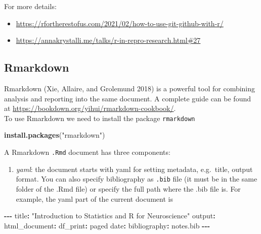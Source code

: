 \documentclass[
]{article}
\newenvironment{Shaded}{\begin{snugshade}}{\end{snugshade}}
\newcommand{\FunctionTok}[1]{\textcolor[rgb]{0.13,0.29,0.53}{\textbf{#1}}}
\newcommand{\NormalTok}[1]{#1}
\newcommand{\SpecialCharTok}[1]{\textcolor[rgb]{0.81,0.36,0.00}{\textbf{#1}}}
\newcommand{\StringTok}[1]{\textcolor[rgb]{0.31,0.60,0.02}{#1}}
\providecommand{\tightlist}{%
  \setlength{\itemsep}{0pt}\setlength{\parskip}{0pt}}
\begin{document}
For more details:

\begin{itemize}
\tightlist
\item
  \url{https://rfortherestofus.com/2021/02/how-to-use-git-github-with-r/}
\item
  \url{https://annakrystalli.me/talks/r-in-repro-research.html\#27}
\end{itemize}

\hypertarget{rmarkdown}{%
\subsection{Rmarkdown}\label{rmarkdown}}

Rmarkdown (Xie, Allaire, and Grolemund 2018) is a powerful tool for
combining analysis and reporting into the same document. A complete
guide can be found at
\url{https://bookdown.org/yihui/rmarkdown-cookbook/}.\\
To use Rmarkdown we need to install the package \texttt{rmarkdown}

\begin{Shaded}
\begin{Highlighting}[]
\FunctionTok{install.packages}\NormalTok{(}\StringTok{"rmarkdown"}\NormalTok{)}
\end{Highlighting}
\end{Shaded}

A Rmarkdown \texttt{.Rmd} document has three components:

\begin{enumerate}
\def\labelenumi{\arabic{enumi}.}
\tightlist
\item
  \emph{yaml}: the document starts with yaml for setting metadata,
  e.g.~title, output format. You can also specify bibliography as
  \texttt{.bib} file (it must be in the same folder of the .Rmd file) or
  specify the full path where the .bib file is. For example, the yaml
  part of the current document is
\end{enumerate}

\begin{Shaded}
\begin{Highlighting}[]
\SpecialCharTok{{-}{-}{-}}
\NormalTok{title}\SpecialCharTok{:} \StringTok{"Introduction to Statistics and R for Neuroscience"}
\NormalTok{output}\SpecialCharTok{:}
\NormalTok{html\_document}\SpecialCharTok{:}
\NormalTok{    df\_print}\SpecialCharTok{:}\NormalTok{ paged}
\NormalTok{date}\SpecialCharTok{:} \StringTok{\textquotesingle{}\textquotesingle{}}
\NormalTok{bibliography}\SpecialCharTok{:}\NormalTok{ notes.bib}
\SpecialCharTok{{-}{-}{-}}
\end{Highlighting}
\end{Shaded}
\end{document}
